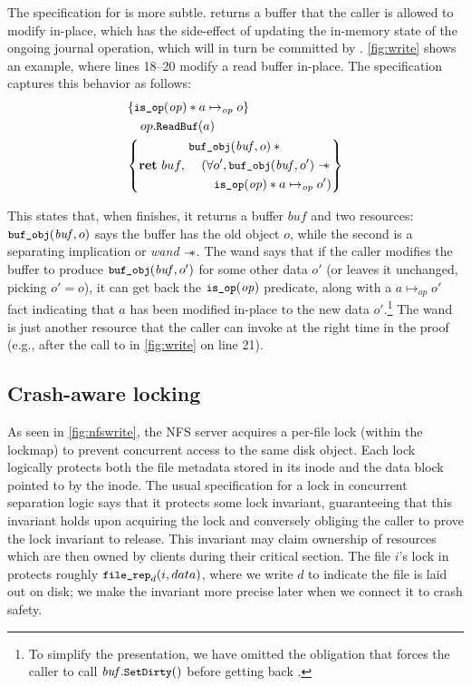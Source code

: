 The specification for  is more subtle.  
returns a buffer that the caller is allowed to modify in-place, which
has the side-effect of updating the in-memory state of the ongoing journal operation, which
will in turn be committed by .  \autoref{fig:write} shows
an example, where lines 18--20 modify a read buffer in-place.  The specification
captures this behavior as follows:
%
\begin{align*}
  \hoareV{\cc{is_op}(\mathit{op}) \sep a \mapsto_{\mathit{op}} o}%
        {op.\cc{ReadBuf}(a)}%
        {\Ret{buf}
  \begin{aligned}
  &\cc{buf_obj}(\mathit{buf}, o) \sep \phantom{} \\
  &\quad( \forall o', \cc{buf_obj}(\mathit{buf}, o') \wand \\
  &\quad\quad \cc{is_op}(\mathit{op}) \sep a \mapsto_{\mathit{op}} o' )
    \end{aligned}}
\end{align*}

This states that, when  finishes, it returns a buffer $\mathit{buf}$
and two resources: $\cc{buf_obj}(\mathit{buf}, o)$ says the buffer has the old
object $o$, while the second is a separating implication or \emph{wand} $\mathrel{-\!\!\ast}$.
The wand says that if
the caller modifies the buffer to produce $\cc{buf_obj}(\mathit{buf}, o')$ for
some other data $o'$ (or leaves it unchanged, picking $o' = o$), it can get back
the $\cc{is_op}(\mathit{op})$ predicate, along with a
$a \mapsto_{\mathit{op}} o'$ fact indicating that $a$ has been modified in-place
to the new data $o'$.\footnote{To simplify the presentation, we have omitted
the obligation that forces the caller to call $\mathit{buf}.\cc{SetDirty}()$
before getting back .} The wand is just another resource that the
caller can invoke at the right time in the proof (e.g., after the call to
 in \autoref{fig:write} on line 21).

\subsection{Crash-aware locking}
\label{s:design:crashlock}

As seen in \autoref{fig:nfswrite}, the NFS server acquires a per-file lock
(within the lockmap) to prevent concurrent access to the same disk object.
Each lock
logically protects both the file metadata stored in its inode and the data block pointed
to by the inode. The usual specification for a lock
in concurrent separation logic says
that it protects some lock invariant, guaranteeing that this
invariant holds upon acquiring the lock and conversely obliging the caller to
prove the lock invariant to release.
This invariant may claim ownership of resources which are then owned by clients during their critical section.
The file $i$'s lock in \simplenfs protects
roughly $\cc{file_rep}_{d}(i, data)$, where we write $d$ to indicate the file is
laid out on disk; we make the invariant more precise later when we connect it to
crash safety.

